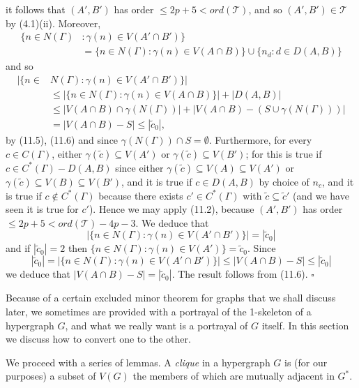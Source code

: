 \noindent it follows that $(A', B')$ has order $\le 2p + 5 < ord(\mathscr{T})$, and so $(A', B') \in \mathscr{T}$ by (4.1)(ii). Moreover,
\begin{align*}
\{n \in N(\Gamma) &\colon \gamma(n) \in V(A' \cap B')\} \\
&= \{n \in N(\Gamma) \colon \gamma(n) \in V(A \cap B)\} \cup \{n_d \colon d \in D(A, B)\}
\end{align*}
and so
\begin{align*}
|\{n \in &N(\Gamma) \colon \gamma(n) \in V(A' \cap B')\}| \\
&\le |\{n \in N(\Gamma) \colon \gamma(n) \in V(A \cap B)\}| + |D(A, B)| \\
&\le |V(A \cap B) \cap \gamma(N(\Gamma))| + |V(A \cap B) - (S \cup \gamma(N(\Gamma)))| \\
&= |V(A \cap B) - S| \le |\tilde{c}_0|,
\end{align*}
by (11.5), (11.6) and since $\gamma(N(\Gamma)) \cap S = \emptyset$. Furthermore, for every $c \in C(\Gamma)$, either $\gamma(\tilde{c}) \subseteq V(A')$ or $\gamma(\tilde{c}) \subseteq V(B')$; for this is true if $c \in C^*(\Gamma) - D(A, B)$ since either $\gamma(\tilde{c}) \subseteq V(A) \subseteq V(A')$ or $\gamma(\tilde{c}) \subseteq V(B) \subseteq V(B')$, and it is true if $c \in D(A, B)$ by choice of $n_c$, and it is true if $c \notin C^*(\Gamma)$ because there exists $c' \in C^*(\Gamma)$ with $\tilde{c} \subseteq \tilde{c}'$ (and we have seen it is true for $c'$). Hence we may apply (11.2), because $(A', B')$ has order $\le 2p + 5 < ord(\mathscr{T}) - 4p - 3$. We deduce that
\begin{equation*}
|\{n \in N(\Gamma) \colon \gamma(n) \in V(A' \cap B')\}| = |\tilde{c}_0|
\end{equation*}
and if $|\tilde{c}_0| = 2$ then $\{n \in N(\Gamma) \colon \gamma(n) \in V(A')\} = \tilde{c}_0$. Since
\begin{equation*}
|\tilde{c}_0| = |\{n \in N(\Gamma) \colon \gamma(n) \in V(A' \cap B')\}| \le |V(A \cap B) - S| \le |\tilde{c}_0|
\end{equation*}
we deduce that $|V(A \cap B) - S| = |\tilde{c}_0|$. The result follows from (11.6). $\square$


Because of a certain excluded minor theorem for graphs that we shall discuss later, we sometimes are provided with a portrayal of the 1-skeleton of a hypergraph $G$, and what we really want is a portrayal of $G$ itself. In this section we discuss how to convert one to the other.

We proceed with a series of lemmas. A \textit{clique} in a hypergraph $G$ is (for our purposes) a subset of $V(G)$ the members of which are mutually adjacent in $G^*$.
